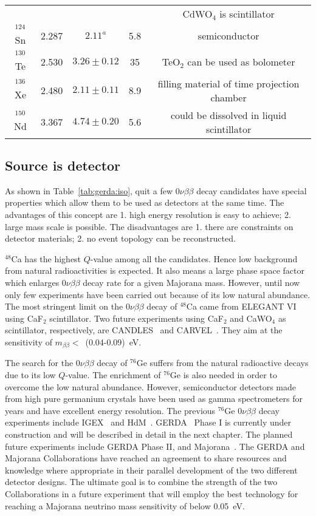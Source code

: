 \begin{table}[htbp]
\begin{minipage}{\linewidth}
\begin{tabular}{ccccc}
& & & & CdWO$_{4}$ is scintillator\\
      $^{124}$Sn & 2.287 & $2.11^{a}$ & 5.8 & semiconductor \\
      $^{130}$Te & 2.530 & $3.26 \pm 0.12$ & 35 & TeO$_{2}$ can be       used as bolometer\\
      $^{136}$Xe & 2.480 & $2.11 \pm 0.11$ & 8.9 & filling material of       time projection chamber\\
      $^{150}$Nd & 3.367 & $4.74 \pm 0.20$ & 5.6 & could be dissolved       in liquid scintillator\\
    \end{tabular}
  \end{minipage}
\end{table}

\subsection{Source is detector}
\label{sec:exp:sed}
As shown in Table~\ref{tab:gerda:iso}, quit a few $0\nu\beta\beta$ decay candidates have special properties which allow them to be used as detectors at the same time. The advantages of this concept are 1. high energy resolution is easy to achieve; 2. large mass scale is possible. The disadvantages are 1. there are constraints on detector materials; 2. no event topology can be reconstructed.

$^{48}$Ca has the highest $Q$-value among all the candidates. Hence low background from natural radioactivities is expected. It also means a large phase space factor which enlarges $0\nu\beta\beta$ decay rate for a given Majorana mass. However, until now only few experiments have been carried out because of its low natural abundance. The most stringent limit on the $0\nu\beta\beta$ decay of $^{48}$Ca came from ELEGANT VI~\cite{Oga04} using CaF$_{2}$ scintillator. Two future experiments using CaF$_{2}$ and CaWO$_{4}$ as scintillator, respectively, are CANDLES~\cite{Hir08} and CARVEL~\cite{Zde05}. They aim at the sensitivity of $m_{\beta\beta} <$~(0.04-0.09)~eV.

The search for the $0\nu\beta\beta$ decay of $^{76}$Ge suffers from the natural radioactive decays due to its low $Q$-value. The enrichment of $^{76}$Ge is also needed in order to overcome the low natural abundance. However, semiconductor detectors made from high pure germanium crystals have been used as gamma spectrometers for years and have excellent energy resolution. The previous $^{76}$Ge $0\nu\beta\beta$ decay experiments include IGEX~\cite{Aal02} and HdM~\cite{Hei04}. GERDA~\cite{Sch05} Phase I is currently under construction and will be described in detail in the next chapter. The planned future experiments include GERDA Phase II, and Majorana~\cite{Gai03, Aal04}. The GERDA and Majorana Collaborations have reached an agreement to share resources and knowledge where appropriate in their parallel development of the two different detector designs. The ultimate goal is to combine the strength of the two Collaborations in a future experiment that will employ the best technology for reaching a Majorana neutrino mass sensitivity of below 0.05~eV.

